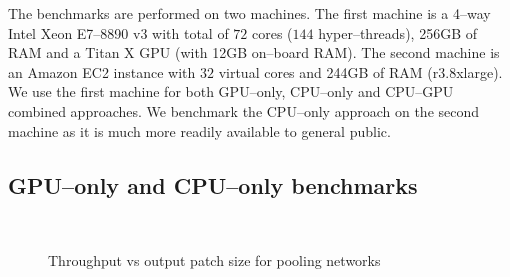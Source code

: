 \documentclass[conference]{IEEEtran}
\begin{document}
  The benchmarks are performed on two machines.  The first machine is
  a 4--way Intel Xeon E7--8890 v3 with total of $72$ cores ($144$
  hyper--threads), 256GB of RAM and a Titan X GPU (with 12GB on--board
  RAM).  The second machine is an Amazon EC2 instance with $32$
  virtual cores and 244GB of RAM (r3.8xlarge).  We use the first
  machine for both GPU--only, CPU--only and CPU--GPU combined
  approaches.  We benchmark the CPU--only approach on the second
  machine as it is much more readily available to general public.


\subsection{GPU--only and CPU--only benchmarks}

  \begin{figure}[h!t]
    \centering
    \\

    \caption{Throughput vs output patch size for pooling networks
    }
    \label{fig:experiments1}
  \end{figure}
\end{document}
